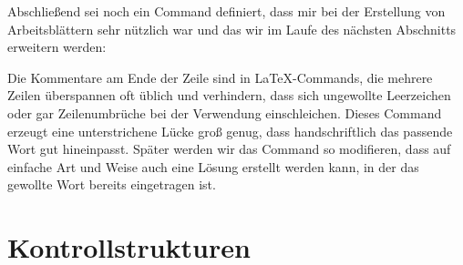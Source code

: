 Abschließend sei noch ein Command definiert, dass mir bei der Erstellung von Arbeitsblättern sehr nützlich war und das wir im Laufe des nächsten Abschnitts erweitern werden:
\begin{latexlisting}
	\newcommand{\blank}[1]{%
		\underline{\phantom{#1#1#1}}%
	}
\end{latexlisting}
Die Kommentare am Ende der Zeile sind in \LaTeX{}-Commands, die mehrere Zeilen überspannen oft üblich und verhindern, dass sich ungewollte Leerzeichen oder gar Zeilenumbrüche bei der Verwendung einschleichen.
Dieses Command erzeugt eine unterstrichene Lücke groß genug, dass handschriftlich das passende Wort gut hineinpasst.
Später werden wir das Command so modifieren, dass auf einfache Art und Weise auch eine Lösung erstellt werden kann, in der das gewollte Wort bereits eingetragen ist.

\section{Kontrollstrukturen}

